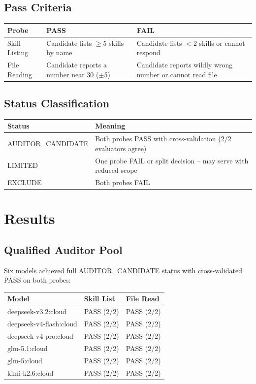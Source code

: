 \documentclass[11pt,a4paper]{article}
\begin{document}
\subsection{Pass Criteria}

\begin{center}
\begin{tabular}{l p{5cm} p{5cm}}
\toprule
\textbf{Probe} & \textbf{PASS} & \textbf{FAIL} \\
\midrule
Skill Listing & Candidate lists $\geq$5 skills by name & Candidate lists $<$2 skills or cannot respond \\
File Reading & Candidate reports a number near 30 ($\pm$5) & Candidate reports wildly wrong number or cannot read file \\
\bottomrule
\end{tabular}
\end{center}

\subsection{Status Classification}

\begin{center}
\begin{tabular}{l p{6.5cm}}
\toprule
\textbf{Status} & \textbf{Meaning} \\
\midrule
AUDITOR\_CANDIDATE & Both probes PASS with cross-validation (2/2 evaluators agree) \\
LIMITED & One probe FAIL or split decision -- may serve with reduced scope \\
EXCLUDE & Both probes FAIL \\
\bottomrule
\end{tabular}
\end{center}

\section{Results}

\subsection{Qualified Auditor Pool}

Six models achieved full AUDITOR\_CANDIDATE status with cross-validated PASS on both probes:

\begin{center}
\begin{tabular}{l l l}
\toprule
\textbf{Model} & \textbf{Skill List} & \textbf{File Read} \\
\midrule
deepseek-v3.2:cloud & PASS (2/2) & PASS (2/2) \\
deepseek-v4-flash:cloud & PASS (2/2) & PASS (2/2) \\
deepseek-v4-pro:cloud & PASS (2/2) & PASS (2/2) \\
glm-5.1:cloud & PASS (2/2) & PASS (2/2) \\
glm-5:cloud & PASS (2/2) & PASS (2/2) \\
kimi-k2.6:cloud & PASS (2/2) & PASS (2/2) \\
\bottomrule
\end{tabular}
\end{center}
\end{document}
